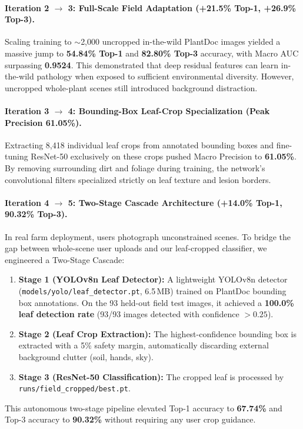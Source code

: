 \paragraph{Iteration 2 $\rightarrow$ 3: Full-Scale Field Adaptation (+21.5\% Top-1, +26.9\% Top-3).} Scaling training to $\sim$2,000 uncropped in-the-wild PlantDoc images yielded a massive jump to \textbf{54.84\% Top-1} and \textbf{82.80\% Top-3} accuracy, with Macro AUC surpassing \textbf{0.9524}. This demonstrated that deep residual features can learn in-the-wild pathology when exposed to sufficient environmental diversity. However, uncropped whole-plant scenes still introduced background distraction.

\paragraph{Iteration 3 $\rightarrow$ 4: Bounding-Box Leaf-Crop Specialization (Peak Precision 61.05\%).} Extracting 8,418 individual leaf crops from annotated bounding boxes and fine-tuning ResNet-50 exclusively on these crops pushed Macro Precision to \textbf{61.05\%}. By removing surrounding dirt and foliage during training, the network's convolutional filters specialized strictly on leaf texture and lesion borders.

\paragraph{Iteration 4 $\rightarrow$ 5: Two-Stage Cascade Architecture (+14.0\% Top-1, 90.32\% Top-3).} In real farm deployment, users photograph unconstrained scenes. To bridge the gap between whole-scene user uploads and our leaf-cropped classifier, we engineered a Two-Stage Cascade:
\begin{enumerate}
    \item \textbf{Stage 1 (YOLOv8n Leaf Detector):} A lightweight YOLOv8n detector~\cite{yolov8} (\texttt{models/yolo/leaf\_detector.pt}, 6.5\,MB) trained on PlantDoc bounding box annotations. On the 93 held-out field test images, it achieved a \textbf{100.0\% leaf detection rate} (93/93 images detected with confidence $>0.25$).
    \item \textbf{Stage 2 (Leaf Crop Extraction):} The highest-confidence bounding box is extracted with a 5\% safety margin, automatically discarding external background clutter (soil, hands, sky).
    \item \textbf{Stage 3 (ResNet-50 Classification):} The cropped leaf is processed by \texttt{runs/field\_cropped/best.pt}.
\end{enumerate}
This autonomous two-stage pipeline elevated Top-1 accuracy to \textbf{67.74\%} and Top-3 accuracy to \textbf{90.32\%} without requiring any user crop guidance.

